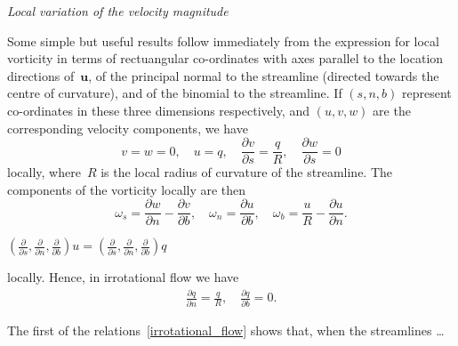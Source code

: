 \documentclass{article}
\newcommand{\pfrac}[2]{\frac{\partial #1}{\partial #2}}
\begin{document}
\setlength{\abovedisplayshortskip}{-.5\baselineskip plus 3pt}%
\noindent \textit{Local variation of the velocity magnitude}

Some simple but useful results follow immediately from the expression 
for local vorticity in terms of rectuangular co-ordinates with axes
parallel to the location directions of~$\mathbf{u}$, of the principal
normal to the streamline (directed towards the centre of curvature),
and of the binomial to the streamline. If $(s,n,b)$ represent
co-ordinates in these three dimensions respectively, and $(u,v,w)$
are the corresponding velocity components, we have
\[
	v = w = 0,
	\quad
	u = q,
	\quad
	\pfrac{v}{s} = \frac{q}{R},
	\quad
	\pfrac{w}{s} = 0
\]
locally, where~$R$ is the local radius of curvature of the streamline.
The components of the vorticity locally are then
\[
  \omega_s=\pfrac{w}{n}-\pfrac{v}{b}, \quad 
  \omega_n=\pfrac{u}{b}, \quad 
  \omega_b=\frac{u}{R}-\pfrac{u}{n}.
\]
\noindent\leavevmode{}%
\centerline{$\displaystyle
  \left(\pfrac{}{s},\pfrac{}{n},\pfrac{}{b}\right)u=
  \left(\pfrac{}{s},\pfrac{}{n},\pfrac{}{b}\right)q$}
locally. Hence, in irrotational flow we have
\begin{align}
	\pfrac{q}{n}=\frac{q}{R},
	\quad
	\pfrac{q}{b}=0. \tag{6.2.13}\label{irrotational_flow}
\end{align}

The first of the relations~\eqref{irrotational_flow} shows that, when
the streamlines \ldots
\end{document}
